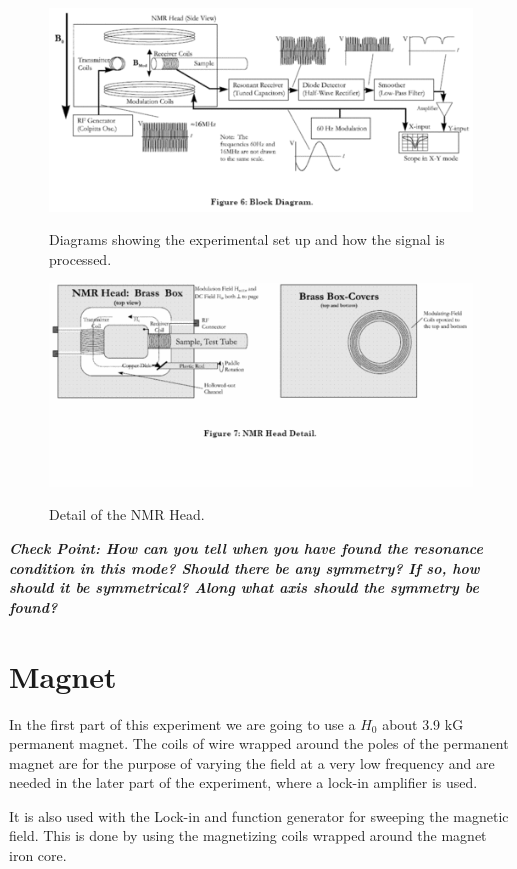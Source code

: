 \documentclass{../lab}
\begin{document}
\begin{figure}[h]
    \centering
    \href{http://experimentationlab.berkeley.edu/sites/default/files/images/500px-NMR10.gif}{\includegraphics[width=0.5\linewidth]{images/500px-NMR10.png}}
    \caption{Diagrams showing the experimental set up and how the signal is processed.}
    \label{fig:500px-NMR10}
\end{figure}

\begin{figure}[h]
    \centering
    \href{http://experimentationlab.berkeley.edu/sites/default/files/images/500px-NMR11.gif}{\includegraphics[width=0.5\linewidth]{images/500px-NMR11.png}}
    \caption{Detail of the NMR Head.}
    \label{fig:DetailOfNMRHead}
\end{figure}

\emph{\textbf{Check Point: How can you tell when you have found the resonance condition in this mode? Should there be any symmetry? If so, how should it be symmetrical? Along what axis should the symmetry be found?}}

\newpage

\section{Magnet}

In the first part of this experiment we are going to use a $H_0$ about 3.9 kG permanent magnet. The coils of wire wrapped around the poles of the permanent magnet are for the purpose of varying the field at a very low frequency and are needed in the later part of the experiment, where a lock-in amplifier is used.

It is also used with the Lock-in and function generator for sweeping the magnetic field. This is done by using the magnetizing coils wrapped around the magnet iron core.
\end{document}
